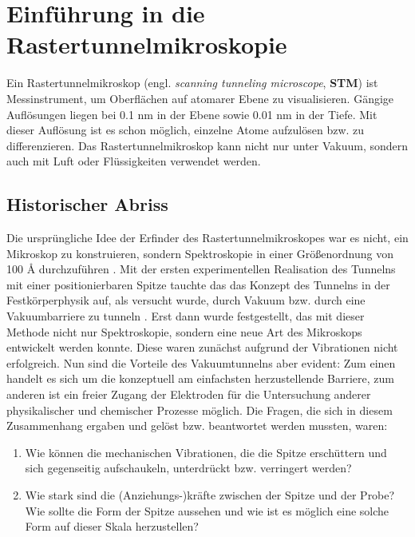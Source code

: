 \section{Einführung in die Rastertunnelmikroskopie}
Ein Rastertunnelmikroskop (engl. \textit{scanning tunneling
microscope}, \textbf{STM}) ist Messinstrument, um Oberflächen
auf atomarer Ebene zu visualisieren. Gängige Auflösungen liegen
bei 0.1 nm in der Ebene sowie 0.01 nm in der Tiefe. Mit dieser
Auflösung ist es schon möglich, einzelne Atome aufzulösen bzw.
zu differenzieren. Das Rastertunnelmikroskop kann nicht nur unter
Vakuum, sondern auch mit Luft oder Flüssigkeiten verwendet werden.
\subsection{Historischer Abriss}
Die ursprüngliche Idee der Erfinder des Rastertunnelmikroskopes
war es nicht, ein Mikroskop zu konstruieren,
sondern Spektroskopie in einer Größenordnung von 
100 \r{A} durchzuführen \cite{binnig1987scanning}.
Mit der ersten experimentellen Realisation \cite{thompson1976thermal}
des Tunnelns mit einer positionierbaren Spitze tauchte das 
das Konzept des Tunnelns in der 
Festkörperphysik auf, als versucht wurde, durch Vakuum bzw. durch
eine Vakuumbarriere zu tunneln \cite{binnig1982tunneling}. 
Erst dann wurde festgestellt, das mit dieser Methode nicht nur
Spektroskopie, sondern eine neue Art des Mikroskops entwickelt werden
konnte.
Diese
waren zunächst aufgrund der Vibrationen nicht erfolgreich. Nun sind
die Vorteile des Vakuumtunnelns aber evident: 
Zum einen handelt es sich um die konzeptuell am einfachsten
herzustellende Barriere, zum anderen ist ein freier Zugang 
der Elektroden für die Untersuchung anderer
physikalischer und chemischer Prozesse möglich.
Die Fragen, die sich in diesem Zusammenhang
ergaben und gelöst bzw. beantwortet werden mussten, waren:

\begin{enumerate}
\item Wie können die mechanischen Vibrationen, die die Spitze
erschüttern und sich gegenseitig aufschaukeln, unterdrückt bzw.
verringert werden?
\item Wie stark sind die (Anziehungs-)kräfte zwischen der Spitze
und der Probe? Wie sollte die Form der Spitze aussehen und wie
ist es möglich eine solche Form auf dieser Skala herzustellen?

\end{enumerate}

